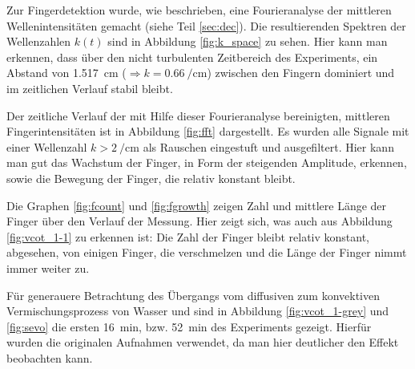 Zur Fingerdetektion wurde, wie beschrieben, eine Fourieranalyse der mittleren Wellenintensitäten gemacht (siehe Teil \ref{sec:dec}). Die resultierenden Spektren der Wellenzahlen $k(t)$ sind in Abbildung \ref{fig:k_space} zu sehen. Hier kann man erkennen, dass über den nicht turbulenten Zeitbereich des Experiments, ein Abstand von \SI[round-precision=2]{1,517}{\centi\meter} ($\Rightarrow k=\SI[round-precision=2]{0,66}{\per\centi\meter}$) zwischen den Fingern dominiert und im zeitlichen Verlauf stabil bleibt. 

Der zeitliche Verlauf der mit Hilfe dieser Fourieranalyse bereinigten, mittleren Fingerintensitäten ist in Abbildung \ref{fig:fft} dargestellt. Es wurden alle Signale mit einer Wellenzahl $k > \SI{2}{\per\centi\meter}$ als Rauschen eingestuft und ausgefiltert. Hier kann man gut das Wachstum der Finger, in Form der steigenden Amplitude, erkennen, sowie die Bewegung der Finger, die relativ konstant bleibt. 



Die Graphen \ref{fig:fcount} und \ref{fig:fgrowth} zeigen Zahl und mittlere Länge der Finger über den Verlauf der Messung. Hier zeigt sich, was auch aus  Abbildung \ref{fig:vcot_1-1} zu erkennen ist: Die Zahl der Finger bleibt relativ konstant, abgesehen, von einigen Finger, die verschmelzen und die Länge der Finger nimmt immer weiter zu.

Für generauere Betrachtung des Übergangs vom diffusiven zum konvektiven Vermischungsprozess von Wasser und \COT sind in Abbildung \ref{fig:vcot_1-grey} und \ref{fig:sevo} die ersten \SI{16}{\minute}, bzw. \SI{52}{\minute} des Experiments gezeigt. Hierfür wurden die originalen Aufnahmen verwendet, da man hier deutlicher den Effekt beobachten kann.

